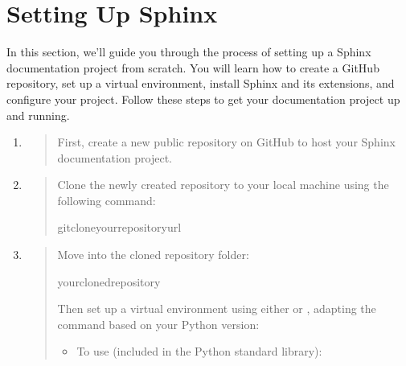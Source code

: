 \documentclass[a4paper,10pt,english]{sphinxmanual}
\begin{document}
\sphinxstepscope


\section{Setting Up Sphinx}
\label{\detokenize{page_one:setting-up-sphinx}}\label{\detokenize{page_one::doc}}
\sphinxAtStartPar
In this section, we’ll guide you through the process of setting up a Sphinx documentation project from scratch. You will learn how to create a GitHub repository, set up a virtual environment, install Sphinx and its extensions, and configure your project. Follow these steps to get your documentation project up and running.
\begin{enumerate}
%
\item {} 
\sphinxAtStartPar
{}
\begin{quote}

\sphinxAtStartPar
First, create a new public repository on GitHub to host your Sphinx documentation project.
\end{quote}

\item {} 
\sphinxAtStartPar
{}
\begin{quote}

\sphinxAtStartPar
Clone the newly created repository to your local machine using the following command:

\begin{sphinxVerbatim}[commandchars=\\\{\}]
gitclone\PYGZlt{}your\PYGZhy{}repository\PYGZhy{}url\PYGZgt{}
\end{sphinxVerbatim}
\end{quote}

\item {} 
\sphinxAtStartPar
{}
\begin{quote}

\sphinxAtStartPar
Move into the cloned repository folder:

\begin{sphinxVerbatim}[commandchars=\\\{\}]
\PYGZlt{}your\PYGZhy{}cloned\PYGZhy{}repository\PYGZgt{}
\end{sphinxVerbatim}

\sphinxAtStartPar
Then set up a virtual environment using either  or , adapting the command based on your Python version:
\begin{itemize}
\item {} 
\sphinxAtStartPar
To use  (included in the Python standard library):


\end{itemize}
\end{quote}
\end{enumerate}
\end{document}
